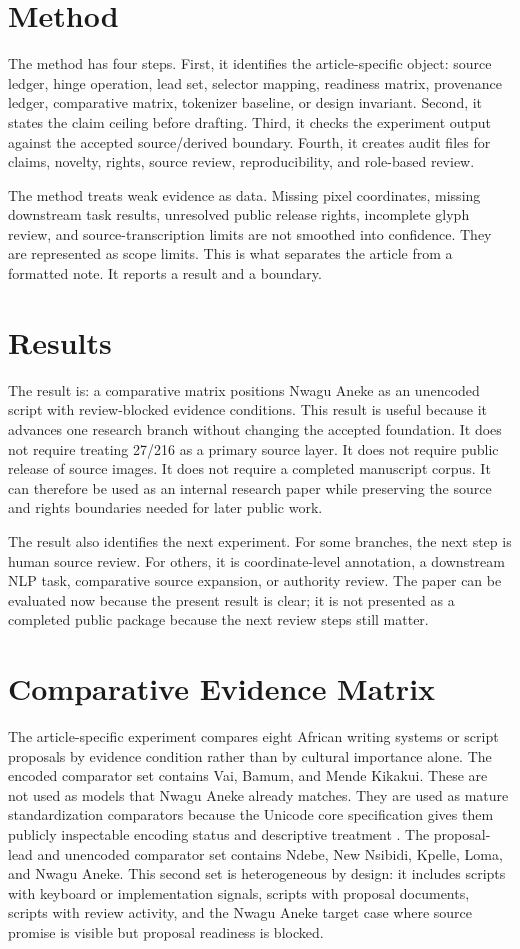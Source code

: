 \documentclass[sigconf,nonacm]{acmart}
\begin{document}
\section{Method}
The method has four steps. First, it identifies the article-specific object:
source ledger, hinge operation, lead set, selector mapping, readiness matrix,
provenance ledger, comparative matrix, tokenizer baseline, or design invariant.
Second, it states the claim ceiling before drafting. Third, it checks the
experiment output against the accepted source/derived boundary. Fourth, it
creates audit files for claims, novelty, rights, source review, reproducibility,
and role-based review.

The method treats weak evidence as data. Missing pixel coordinates, missing
downstream task results, unresolved public release rights, incomplete glyph
review, and source-transcription limits are not smoothed into confidence. They
are represented as scope limits. This is what separates the article from a
formatted note. It reports a result and a boundary.

\section{Results}
The result is: a comparative matrix positions Nwagu Aneke as an unencoded script with review-blocked evidence conditions. This result is useful because it advances one research
branch without changing the accepted foundation. It does not require treating
27/216 as a primary source layer. It does not require public release of source
images. It does not require a completed manuscript corpus. It can therefore be
used as an internal research paper while preserving the source and rights
boundaries needed for later public work.

The result also identifies the next experiment. For some branches, the next step
is human source review. For others, it is coordinate-level annotation, a
downstream NLP task, comparative source expansion, or authority review. The
paper can be evaluated now because the present result is clear; it is not
presented as a completed public package because the next review steps still
matter.

\section{Comparative Evidence Matrix}
The article-specific experiment compares eight African writing systems or
script proposals by evidence condition rather than by cultural importance alone.
The encoded comparator set contains Vai, Bamum, and Mende Kikakui. These are
not used as models that Nwagu Aneke already matches. They are used as mature
standardization comparators because the Unicode core specification gives them
publicly inspectable encoding status and descriptive treatment
\cite{unicodeAfricanScripts2023,seiProposalTips}. The proposal-lead and
unencoded comparator set contains Ndebe, New Nsibidi, Kpelle, Loma, and Nwagu
Aneke. This second set is heterogeneous by design: it includes scripts with
keyboard or implementation signals, scripts with proposal documents, scripts
with review activity, and the Nwagu Aneke target case where source promise is
visible but proposal readiness is blocked.
\end{document}
